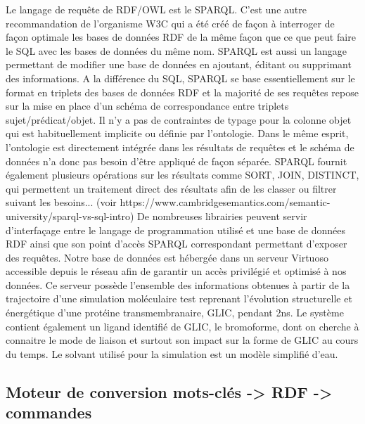 Le langage de requête de RDF/OWL est le SPARQL. C'est une autre recommandation de l'organisme W3C qui a été créé de façon à interroger de façon optimale les bases de données RDF de la même façon que ce que peut faire le SQL avec les bases de données du même nom. SPARQL est aussi un langage permettant de modifier une base de données en ajoutant, éditant ou supprimant des informations. A la différence du SQL, SPARQL se base essentiellement sur le format en triplets des bases de données RDF et la majorité de ses requêtes repose sur la mise en place d'un schéma de correspondance entre triplets sujet/prédicat/objet. Il n'y a pas de contraintes de typage pour la colonne objet qui est habituellement implicite ou définie par l'ontologie. Dans le même esprit, l'ontologie est directement intégrée dans les résultats de requêtes et le schéma de données n'a donc pas besoin d'être appliqué de façon séparée. SPARQL fournit également plusieurs opérations sur les résultats comme SORT, JOIN, DISTINCT, qui permettent un traitement direct des résultats afin de les classer ou filtrer suivant les besoins... (voir https://www.cambridgesemantics.com/semantic-university/sparql-vs-sql-intro) De nombreuses librairies peuvent servir d'interfaçage entre le langage de programmation utilisé et une base de données RDF ainsi que son point d'accès SPARQL correspondant permettant d'exposer des requêtes.
Notre base de données est hébergée dans un serveur Virtuoso accessible depuis le réseau afin de garantir un accès privilégié et optimisé à nos données. Ce serveur possède l'ensemble des informations obtenues à partir de la trajectoire d'une simulation moléculaire test reprenant l'évolution structurelle et énergétique d'une protéine transmembranaire, GLIC, pendant 2ns. Le système contient également un ligand identifié de GLIC, le bromoforme, dont on cherche à connaitre le mode de liaison et surtout son impact sur la forme de GLIC au cours du temps. Le solvant utilisé pour la simulation est un modèle simplifié d'eau.

\subsection{Moteur de conversion mots-clés -> RDF -> commandes}

